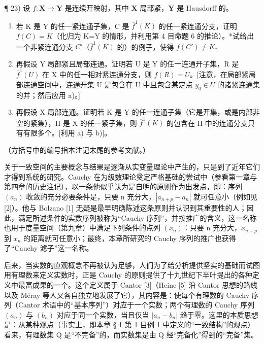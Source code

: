 ¶ 23) 设 \(f: \mathbf{X} \to \mathbf{Y}\) 是连续开映射，其中 \(\mathbf{X}\) 局部紧，\(\mathbf{Y}\) 是 Hausdorff 的。

\begin{enumerate}
\def\labelenumi{\alph{enumi})}
\item
  若 K 是 Y 的任一紧连通子集，C 是 \(\overline{f}^{1}(K)\) 的任一紧连通分支，证明 \(f(C)=K\)（化归为 K=Y 的情形，并利用第 4 目命题 6 的推论）。*试给出一个非紧连通分支 \(C'\)（\(\overline{f}^{1}(K)\) 的）的例子，使得 \(f(C')\neq K_*\)
\item
  再假设 Y 局部紧且局部连通。证明若 U 是 Y 的任一连通开子集，R 是 \(\overline{f}^{1}(U)\) 在 X 中的任一相对紧连通分支，则 \(f(R)=U\)。{[}注意，在局部紧局部连通空间中，连通开集 U 是包含在 U 中且包含某定点 \(y_{0}\in U\) 的诸紧连通集的并；然后应用 a)。{]}
\item
  再假设 X 局部连通。证明若 K 是 Y 的任一连通子集（它是开集，或是内部非空的紧集），H 是 X 的任一紧子集，则 \(\overline{f}^{1}(K)\) 的包含在 H 中的连通分支只有有限多个。{[}利用 a) 与 b){]}。
\end{enumerate}


（方括号中的编号指本注记末尾的参考文献。）

关于一致空间的主要概念与结果是逐渐从实变量理论中产生的，只是到了近年它们才得到系统的研究。Cauchy 在为级数理论奠定严格基础的尝试中（参看第一章与第四章的历史注记），以一条他似乎认为是自明的原则作为出发点，即：序列 \((a_{n})\) 收敛的充分必要条件是，只要 n 充分大，\(|a_{n+p} - a_{n}|\) 就可任意小（例如见 {[}2{]}）。他与 Bolzano {[}1{]} 无疑是最早明确陈述这条原则并认识到其重要性的人；因此，满足所述条件的实数序列被称为“Cauchy 序列”，并按推广的含义，这一名称也用于度量空间（第九章）中满足下列条件的点列 \((x_{n})\)：只要 n 充分大，\(x_{n+p}\) 到 \(x_{n}\) 的距离就可任意小；最终，本章所研究的 Cauchy 序列的推广也获得了“Cauchy 滤子”这一名称。

后来，当实数的直观概念不再被认为足够，人们为了给分析提供坚实的基础而试图用有理数来定义实数时，正是 Cauchy 的原则提供了十九世纪下半叶提出的各种定义中最富成果的一个。这个定义属于 Cantor {[}3{]}（Heine {[}5{]} 沿 Cantor 思想的路线以及 Méray 等人又各自独立地发展了它），其内容是：使每个有理数的 Cauchy 序列（Cantor 术语中的“基本序列”）对应于一个实数；两个有理数的 Cauchy 序列 \((a_{n})\) 与 \((b_{n})\) 对应于同一个实数，当且仅当 \(|a_{n} - b_{n}|\) 趋于零。这里的本质思想是：从某种观点（事实上，即本章 § 1 第 1 目例 1 中定义的“一致结构”的观点）看来，有理数集 Q 是“不完备”的，而实数集是由 Q 经“完备化”得到的“完备”集。

